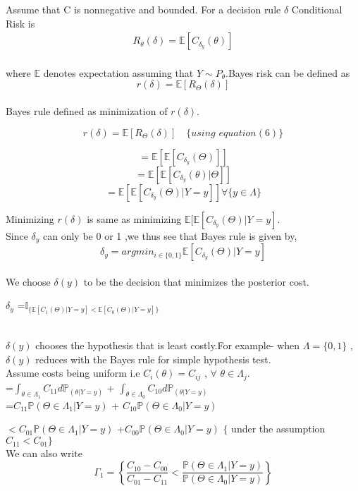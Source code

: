 \documentclass[12pt]{article}
\begin{document}
Assume that C is nonnegative and bounded.
For a decision rule $\delta$ Conditional Risk is
\begin{eqnarray}
& R_\theta (\delta) = \mathbb{E} [ C_{ \delta_y } (\theta)]&  
 \end{eqnarray} \\
where $\mathbb{E}$ denotes expectation assuming that $ Y \sim P_\theta$.Bayes risk  can be defined as $$ r(\delta) = \mathbb{E} [ R_\Theta (\delta)] $$\\

Bayes rule defined as minimization of $r(\delta)$.

$$ r(\delta) = \mathbb{E} [ R_\Theta (\delta)]\,\,\,\,\,\, \{using\,\, equation(6)\} $$ 

 $$ = \mathbb{E}[\mathbb{E}[ C_{ \delta_y } (\Theta)]]$$
$$ = \mathbb{E}[\mathbb{E}[ C_{ \delta_y } (\theta) | \Theta ]] $$
$$ = \mathbb{E}[\mathbb{E}[ C_{ \delta_y } (\Theta) | Y=y ]] \forall \{ y \in \Lambda \}$$

Minimizing $r(\delta)$ is same as minimizing $\mathbb{E}[\mathbb{E}[ C_{ \delta_y } (\Theta) | Y=y ]$. \\
Since $\delta_y $ can only be 0 or 1 ,we thus see that Bayes rule is given by,
$$\delta_y = argmin_{i \in \{0,1\}} \mathbb{E}[C_{ \delta_y } (\Theta) | Y=y]$$ \\
We choose $\delta (y)$ to be the decision that minimizes the posterior cost.
\begin{large}


$\delta_y$ =$\mathbb{I}_{\{\mathbb{E}[C_1(\Theta) | Y=y] < \mathbb{E}[C_0(\Theta) | Y=y]\}}$
\end{large} \\

$\delta (y)$ chooses the hypothesis that is least costly.For example- when $\Lambda =\{0,1\}$ ,$\delta (y)$ reduces with the Bayes rule for simple hypothesis test. \\

Assume costs being uniform i.e $ C_i (\theta) = C_{ij}$        ,  $\forall$    $ \theta \in \Lambda_j $.\\
=$ \int_{\theta \in \Lambda_1} C_{11} d\mathbb{P}_{(\theta | Y=y)}$ + $ \int_{\theta \in \Lambda_0} C_{10} d\mathbb{P}_{(\theta | Y=y)}$ \\

=$ C_{11} \mathbb{P}(\Theta \in \Lambda_1  | Y=y)$  + $C_{10}  \mathbb{P}(\Theta \in \Lambda_0  | Y=y)$ 


$< C_{01} \mathbb{P}(\Theta \in \Lambda_1  | Y=y)$  +$C_{00}  \mathbb{P}(\Theta \in \Lambda_0  | Y=y)$   $\{$ under the assumption $ C_{11} < C_{01}  \}$ \\
We can also write \\
$$\Gamma_1 =\left\{ \frac{C_{10}-C_{00}}{C_{01}-C_{11}} < \frac{\mathbb{P}(\Theta \in \Lambda_1  | Y=y)}{\mathbb{P}(\Theta \in \Lambda_0  | Y=y)} \right\}$$ 
\end{document}
